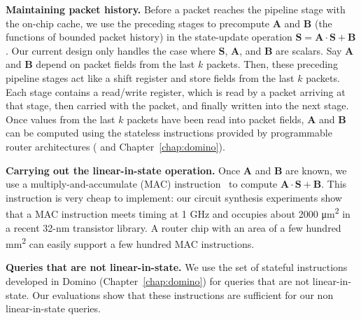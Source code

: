 \textbf{Maintaining packet history.} Before a packet reaches the pipeline stage
with the on-chip cache, we use the preceding stages to precompute
$\boldsymbol{A}$ and $\boldsymbol{B}$ (the functions of bounded packet history)
in the state-update operation $\boldsymbol{S} =\boldsymbol{A} \cdot
\boldsymbol{S} + \boldsymbol{B}$. Our current design only handles the case
where $\boldsymbol{S}$, $\boldsymbol{A}$, and $\boldsymbol{B}$ are scalars. Say
$\boldsymbol{A}$ and $\boldsymbol{B}$ depend on packet fields from the last $k$
packets. Then, these preceding pipeline stages act like a shift register and
store fields from the last $k$ packets. Each stage contains a read/write
register, which is read by a packet arriving at that stage, then carried with
the packet, and finally written into the next stage. Once values from the last
$k$ packets have been read into packet fields, $\boldsymbol{A}$ and
$\boldsymbol{B}$ can be computed using the stateless instructions provided by
programmable router architectures (\cite{rmt} and Chapter~\ref{chap:domino}).

\textbf{Carrying out the linear-in-state operation.} Once $\boldsymbol{A}$ and
$\boldsymbol{B}$ are known, we use a multiply-and-accumulate (MAC)
instruction~\cite{mac} to compute $\boldsymbol{A} \cdot \boldsymbol{S} +
\boldsymbol{B}$. 
This instruction is very cheap to implement: our circuit synthesis experiments
show that a MAC instruction meets timing at 1 GHz and occupies about 2000
\si{\micro\metre\squared} in a recent 32-nm transistor library. A router
chip with an area of a few hundred \si{\milli\meter\squared} can easily support
a few hundred MAC instructions.

\textbf{Queries that are not linear-in-state.} We use the set of stateful
instructions developed in Domino (Chapter~\ref{chap:domino}) for queries that are not
linear-in-state. Our evaluations show that these instructions are sufficient
for our non linear-in-state queries.




